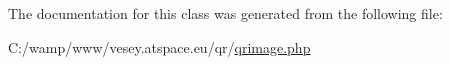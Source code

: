 The documentation for this class was generated from the following file\-:\begin{DoxyCompactItemize}
\item 
C\-:/wamp/www/vesey.\-atspace.\-eu/qr/\hyperlink{qrimage_8php}{qrimage.\-php}\end{DoxyCompactItemize}
